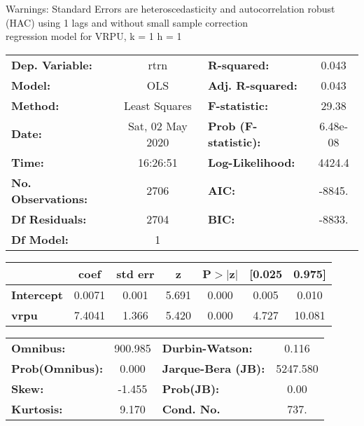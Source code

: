 Warnings: \newline
 [1] Standard Errors are heteroscedasticity and autocorrelation robust (HAC) using 1 lags and without small sample correction\\ 

regression model for VRPU, k = 1 h = 1\begin{center}
\begin{tabular}{lclc}
\toprule
\textbf{Dep. Variable:}    &       rtrn       & \textbf{  R-squared:         } &     0.043   \\
\textbf{Model:}            &       OLS        & \textbf{  Adj. R-squared:    } &     0.043   \\
\textbf{Method:}           &  Least Squares   & \textbf{  F-statistic:       } &     29.38   \\
\textbf{Date:}             & Sat, 02 May 2020 & \textbf{  Prob (F-statistic):} &  6.48e-08   \\
\textbf{Time:}             &     16:26:51     & \textbf{  Log-Likelihood:    } &    4424.4   \\
\textbf{No. Observations:} &        2706      & \textbf{  AIC:               } &    -8845.   \\
\textbf{Df Residuals:}     &        2704      & \textbf{  BIC:               } &    -8833.   \\
\textbf{Df Model:}         &           1      & \textbf{                     } &             \\
\bottomrule
\end{tabular}
\begin{tabular}{lcccccc}
                   & \textbf{coef} & \textbf{std err} & \textbf{z} & \textbf{P$> |$z$|$} & \textbf{[0.025} & \textbf{0.975]}  \\
\midrule
\textbf{Intercept} &       0.0071  &        0.001     &     5.691  &         0.000        &        0.005    &        0.010     \\
\textbf{vrpu}      &       7.4041  &        1.366     &     5.420  &         0.000        &        4.727    &       10.081     \\
\bottomrule
\end{tabular}
\begin{tabular}{lclc}
\textbf{Omnibus:}       & 900.985 & \textbf{  Durbin-Watson:     } &    0.116  \\
\textbf{Prob(Omnibus):} &   0.000 & \textbf{  Jarque-Bera (JB):  } & 5247.580  \\
\textbf{Skew:}          &  -1.455 & \textbf{  Prob(JB):          } &     0.00  \\
\textbf{Kurtosis:}      &   9.170 & \textbf{  Cond. No.          } &     737.  \\
\bottomrule
\end{tabular}
\end{center}


